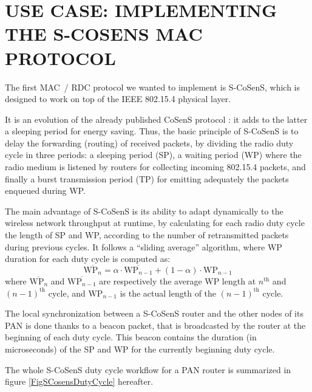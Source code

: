 \documentclass[a4paper,twoside]{article}
\begin{document}
\section{\uppercase{Use Case: implementing the S-CoSenS MAC protocol}}

The first MAC~/ RDC protocol we wanted to implement is S-CoSenS, which
is designed to work on top of the IEEE 802.15.4 physical layer.

It is an evolution of the already published CoSenS protocol \cite{CosensConf}:
it adds to the latter a sleeping period for energy saving.
Thus, the basic principle of S-CoSenS is to delay the forwarding (routing)
of received packets, by dividing the radio duty cycle in three periods:
a sleeping period (SP), a waiting period (WP) where the radio medium
is listened by routers for collecting incoming 802.15.4 packets, and
finally a burst transmission period (TP) for emitting adequately
the packets enqueued during WP.

The main advantage of S-CoSenS is its ability to adapt dynamically to the
wireless network throughput at runtime, by calculating for each radio duty
cycle the length of SP and WP, according to the number of retransmitted
packets during previous cycles. It follows a ``sliding average''
algorithm, where WP duration for each duty cycle is computed as:
\begin{displaymath}
\overline{\mathrm{WP}_{n}} = \alpha \cdot \overline{\mathrm{WP}_{n-1}}
                + (1 - \alpha) \cdot \mathrm{WP}_{n-1}
\end{displaymath}
where $\overline{\mathrm{WP}_{n}}$ and $\overline{\mathrm{WP}_{n-1}}$
are respectively the average WP length at $n^{\mathrm{th}}$ and
$(n-1)^{\mathrm{th}}$ cycle, and $\mathrm{WP}_{n-1}$ is the actual
length of the $(n-1)^{\mathrm{th}}$ cycle.

The local synchronization between a S-CoSenS router and the other nodes
of its PAN is done thanks to a beacon packet, that is broadcasted by
the router at the beginning of each duty cycle. This beacon contains the
duration (in microseconds) of the SP and WP for the currently beginning
duty cycle.

The whole S-CoSenS duty cycle workflow for a PAN router is summarized
in figure \ref{FigSCosensDutyCycle} hereafter.
\end{document}
